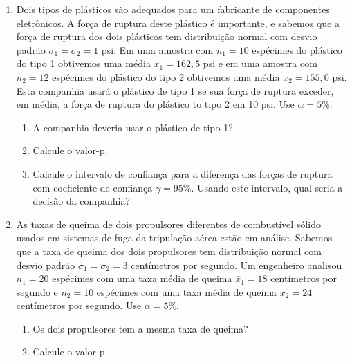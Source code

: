 \documentclass[8pt, a4paper]{article}
\begin{document}
\begin{enumerate}
	\item Dois tipos de plásticos são adequados para um fabricante de componentes eletrônicos. A força de ruptura deste plástico é importante, e sabemos que a força de ruptura dos dois plásticos tem distribuição normal com desvio padrão $\sigma_1=\sigma_2 = 1$ psi. Em uma amostra com $n_1=10$ espécimes do plástico do tipo 1 obtivemos uma média $\bar{x}_1=162,5$ psi e em uma amostra com $n_2=12$ espécimes do plástico do tipo 2 obtivemos uma média $\bar{x}_2=155,0$ psi. Esta companhia usará o plástico de tipo 1 se sua força de ruptura exceder, em média, a força de ruptura do plástico to tipo 2 em 10 psi. Use $\alpha=5\%$.
	\begin{enumerate}
		\item A companhia deveria usar o plástico de tipo 1?
		\item Calcule o valor-p.
		\item Calcule o intervalo de confiança para a diferença das forças de ruptura com coeficiente de confiança $\gamma=95\%$. Usando este intervalo, qual seria a decisão da companhia?
	\end{enumerate}

	\item As taxas de queima de dois propulsores diferentes de combustível sólido usados em sistemas de fuga da tripulação aérea estão em análise. Sabemos que a taxa de queima dos dois propulsores tem distribuição normal com desvio padrão $\sigma_1=\sigma_2=3$ centímetros por segundo. Um engenheiro analisou $n_1=20$ espécimes com uma taxa média de queima $\bar{x}_1=18$ centímetros por segundo e $n_2=10$ espécimes com uma taxa média de queima $\bar{x}_2=24$ centímetros por segundo. Use $\alpha = 5\%$.
	\begin{enumerate}
		\item Os dois propulsores tem a mesma taxa de queima?
		\item Calcule o valor-p.
	\end{enumerate}


\end{enumerate}
\end{document}
